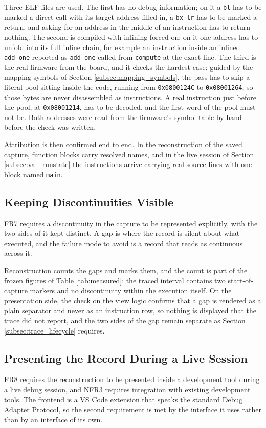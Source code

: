 Three ELF files are used. The first has no debug information; on it a \texttt{bl} has to be marked a direct call with its target address filled in, a \texttt{bx lr} has to be marked a return, and asking for an address in the middle of an instruction has to return nothing. The second is compiled with inlining forced on; on it one address has to unfold into its full inline chain, for example an instruction inside an inlined \texttt{add\_one} reported as \texttt{add\_one} called from \texttt{compute} at the exact line. The third is the real firmware from the board, and it checks the hardest case: guided by the mapping symbols of Section \ref{subsec:mapping_symbols}, the pass has to skip a literal pool sitting inside the code, running from \texttt{0x0800124C} to \texttt{0x08001264}, so those bytes are never disassembled as instructions. A real instruction just before the pool, at \texttt{0x08001214}, has to be decoded, and the first word of the pool must not be. Both addresses were read from the firmware's symbol table by hand before the check was written.

Attribution is then confirmed end to end. In the reconstruction of the saved capture, function blocks carry resolved names, and in the live session of Section \ref{subsec:val_runstate} the instructions arrive carrying real source lines with one block named \texttt{main}.

\subsection{Keeping Discontinuities Visible}
\label{subsec:val_gaps}
FR7 requires a discontinuity in the capture to be represented explicitly, with the two sides of it kept distinct. A gap is where the record is silent about what executed, and the failure mode to avoid is a record that reads as continuous across it.

Reconstruction counts the gaps and marks them, and the count is part of the frozen figures of Table \ref{tab:measured}: the traced interval contains two start-of-capture markers and no discontinuity within the execution itself. On the presentation side, the check on the view logic confirms that a gap is rendered as a plain separator and never as an instruction row, so nothing is displayed that the trace did not report, and the two sides of the gap remain separate as Section \ref{subsec:trace_lifecycle} requires.

\subsection{Presenting the Record During a Live Session}
\label{subsec:val_presentation}
FR8 requires the reconstruction to be presented inside a development tool during a live debug session, and NFR3 requires integration with existing development tools. The frontend is a VS Code extension that speaks the standard Debug Adapter Protocol, so the second requirement is met by the interface it uses rather than by an interface of its own.

